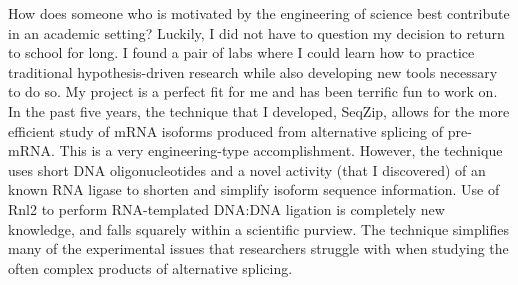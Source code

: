     How does someone who is motivated by the engineering of science best contribute in an academic setting? Luckily, I did not have to question my decision to return to school for long. I found a pair of labs where I could learn how to practice traditional hypothesis-driven research while also developing new tools necessary to do so. My project is a perfect fit for me and has been terrific fun to work on. In the past five years, the technique that I developed, SeqZip, allows for the more efficient study of  mRNA isoforms produced from alternative splicing of pre-mRNA. This is a very engineering-type accomplishment. However, the technique uses short DNA oligonucleotides and a novel activity (that I discovered) of an known RNA ligase to shorten and simplify isoform sequence information. Use of Rnl2 to perform RNA-templated DNA:DNA ligation is completely new knowledge, and falls squarely within a scientific purview. The technique simplifies many of the experimental issues that researchers struggle with when studying the often complex products of alternative splicing.
